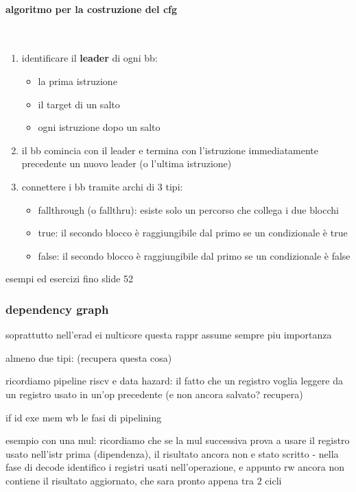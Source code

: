 \paragraph{algoritmo per la costruzione del cfg}~\\

\begin{enumerate}
  \item identificare il \textbf{leader} di ogni bb:
    \begin{itemize}
      \item la prima istruzione
      \item il target di un salto
      \item ogni istruzione dopo un salto
    \end{itemize}
  \item il bb comincia con il leader e termina con l'istruzione immediatamente precedente un nuovo leader (o l'ultima istruzione)
  \item connettere i bb tramite archi di 3 tipi:
    \begin{itemize}
      \item fallthrough (o fallthru): esiste solo un percorso che collega i due blocchi
      \item true: il secondo blocco \`e raggiungibile dal primo se un condizionale \`e true
      \item false: il secondo blocco \`e raggiungibile dal primo se un condizionale \`e false
    \end{itemize}
    
\end{enumerate}

esempi ed esercizi fino slide 52

\subsubsection{dependency graph}

soprattutto nell'erad ei nulticore questa rappr assume sempre piu importanza

almeno due tipi: (recupera questa cosa)

ricordiamo pipeline riscv e data hazard: il fatto che un registro voglia leggere da un registro usato in un'op precedente (e non ancora salvato? recupera)

if id exe mem wb le fasi di pipelining

esempio con una mul: ricordiamo che se la mul successiva prova a usare il registro usato nell'istr prima (dipendenza), il risultato ancora non e stato scritto - nella fase di decode identifico i registri usati nell'operazione, e appunto rw ancora non contiene il risultato aggiornato, che sara pronto appena tra 2 cicli

